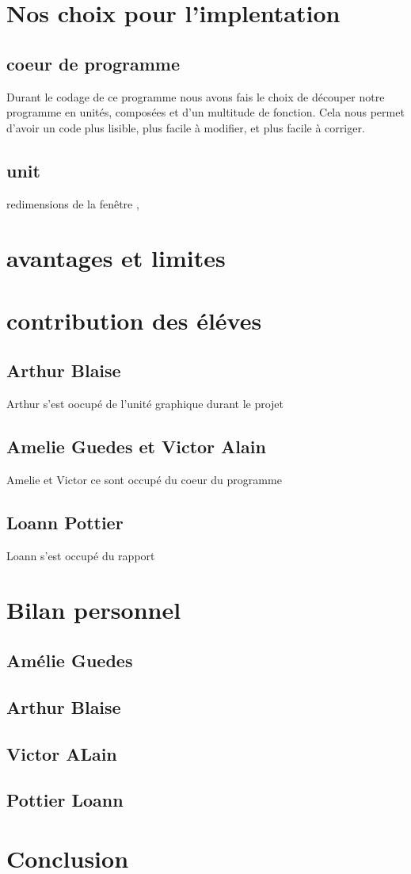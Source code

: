 \documentclass[12pt]{report}
\begin{document}
\section{Nos choix pour l'implentation}
	\subsection{coeur de programme}
Durant le codage de ce programme nous avons fais le choix de découper notre programme en unités, composées et d'un multitude de fonction. Cela nous permet d'avoir un code plus lisible, plus facile à modifier, et plus facile à corriger.
	\subsection{unit}
redimensions de la fenêtre ,
\section{avantages et limites}


\section{contribution des éléves}
\subsection{Arthur Blaise}
	Arthur s'est oocupé de l'unité graphique durant le projet 
\subsection{Amelie Guedes et Victor Alain}
 Amelie et Victor ce sont occupé du coeur du programme 
\subsection{Loann Pottier}
Loann s'est occupé du rapport 
\section{Bilan personnel}
\subsection{Amélie Guedes}
\subsection{Arthur Blaise}
\subsection{Victor ALain}
\subsection{Pottier Loann}
\section{Conclusion}
			
\end{document}
